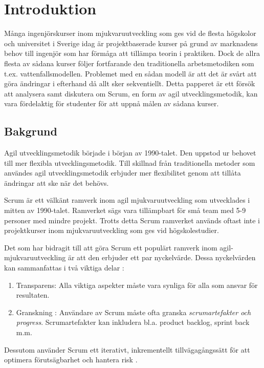 \section{Introduktion}
\label{sec:Lieth_Wahid-introduction}
Många ingenjörskurser inom mjukvaruutveckling som ges vid de flesta högskolor och universitet i Sverige idag är projektbaserade kurser på grund av marknadens behov till ingenjör som har förmåga att tillämpa teorin i praktiken. Dock de allra flesta av sådana kurser följer fortfarande den traditionella arbetsmetodiken som t.ex. vattenfallsmodellen. Problemet med en sådan modell är att det är svårt att göra ändringar i efterhand då allt sker sekventiellt. Detta papperet är ett försök att analysera samt diskutera om Scrum, en form av agil utvecklingsmetodik, kan vara fördelaktig för studenter för att uppnå målen av sådana kurser.
 

\subsection{Bakgrund}
Agil utvecklingsmetodik började i början av 1990-talet. Den uppstod ur behovet till mer flexibla utvecklingsmetodik. Till skillnad från traditionella metoder som användes agil utvecklingsmetodik erbjuder mer flexibilitet genom att tillåta ändringar att ske när det behövs.

Scrum är ett välkänt ramverk inom agil mjukvaruutveckling som utvecklades i mitten av 1990-talet\cite{WhatisSc87:online}. Ramverket sägs vara tillämpbart för små team med 5-9 personer med mindre projekt. Trotts detta Scrum ramverket används oftast inte i projektkurser inom mjukvaruutveckling som ges vid högskolestudier. 

Det som har bidragit till att göra Scrum ett  populärt ramverk inom agil-mjukvaruutveckling är att den erbjuder ett par nyckelvärde. Dessa nyckelvärden kan sammanfattas i två viktiga delar \cite{TheScrum6:online} : 
\begin{enumerate}
	\item Transparens: Alla viktiga aspekter måste vara synliga för alla som ansvar för resultaten.
	\item Granskning : Användare av Scrum måste ofta granska \textit{scrumartefakter och progress}. Scrumartefakter kan inkludera bl.a. product backlog, sprint back m.m.
\end{enumerate} 
Dessutom använder Scrum ett iterativt, inkrementellt tillvägagångssätt för att optimera förutsägbarhet och hantera risk \cite{TheScrum6:online,}. 

